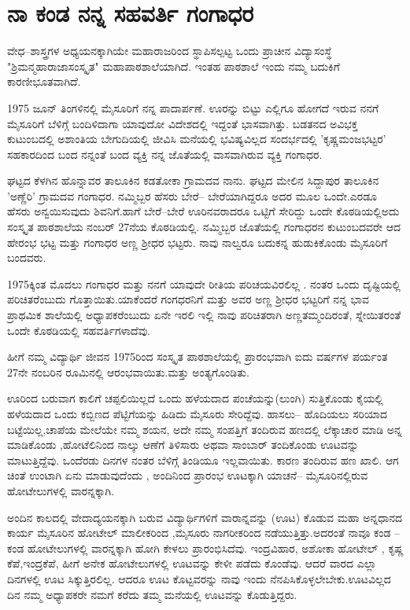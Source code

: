 \chapter{ನಾ ಕಂಡ ನನ್ನ ಸಹವರ್ತಿ ಗಂಗಾಧರ}

\begin{center}
\addrule
\end{center}

ವೇಧ–ಶಾಸ್ತ್ರಗಳ ಅಧ್ಯಯನಕ್ಕಾಗಿಯೇ ಮಹಾರಾಜರಿಂದ ಸ್ಥಾಪಿಸಲ್ಪಟ್ಟ ಒಂದು ಪ್ರಾಚೀನ ವಿದ್ಯಾಸಂಸ್ಥೆ   "ಶ್ರಿಮನ್ಮಹಾರಾಜಾಸಂಸ್ಕೃತ" ಮಹಾಪಾಠಶಾಲೆಯಾಗಿದೆ.  ಇಂತಹ ಪಾಠಶಾಲೆ ಇಂದು ನಮ್ಮ ಬದುಕಿಗೆ ಕಾರಣೀಭೂತವಾಗಿದೆ. 

1975 ಜೂನ್ ತಿಂಗಳಿನಲ್ಲಿ ಮೈಸೂರಿಗೆ ನನ್ನ ಪಾದಾರ್ಪಣೆ. ಊರನ್ನು ಬಿಟ್ಟು ಎಲ್ಲಿಗೂ ಹೋಗದೆ ಇರುವ ನನಗೆ ಮೈಸೂರಿಗೆ ಬೆಳಿಗ್ಗೆ ಬಂದಿಳಿದಾಗಾ ಯಾವುದೋ ವಿದೇಶದಲ್ಲಿ ಇದ್ದಂತೆ ಭಾಸವಾಗಿತ್ತು. ಬಡತನದ ಅವಿಭಕ್ತ ಕುಟುಂಬದಲ್ಲಿ  ಅಶಾಂತಿಯ ಬೇಗುದಿಯಲ್ಲಿ ಜೀವಿಸಿ ಮನೆಯಲ್ಲಿ ಭವಿಷ್ಯವಿಲ್ಲದ ಸಂದರ್ಭದಲ್ಲಿ 'ಕೃಷ್ಣಮಂಜಭಟ್ಟರ' ಸಹಕಾರದಿಂದ ಬಂದ ನನ್ನಂತೆ  ಬಂದ ವ್ಯಕ್ತಿ ನನ್ನ ಜೊತೆಯಲ್ಲಿ ವಾಸವಾಗಿರುವ ವ್ಯಕ್ತಿ ಗಂಗಾಧರ.

ಘಟ್ಟದ ಕೆಳಗಿನ ಹೊನ್ನಾವರ ತಾಲೂಕಿನ ಕಡತೋಕಾ ಗ್ರಾಮದವ ನಾನು. ಘಟ್ಟದ ಮೇಲಿನ ಸಿದ್ದಾಪುರ ತಾಲೂಕಿನ 'ಅಣ್ಣೆರಿ' ಗ್ರಾಮದವ ಗಂಗಾಧರ. ನಮ್ಮಿಬ್ಬರ ಹೆಸರು ಬೇರೆ– ಬೇರೆಯಾಗಿದ್ದರೂ ಅದರ ಮೂಲ ಒಂದೇ.ಎರಡೂ ಹೆಸರು   ಅನ್ವಯಿಸುವುದು ಶಿವನಿಗೆ.ಹಾಗೆ ಬೇರೆ–ಬೇರೆ  ಊರಿನವರಾದರೂ ಒಟ್ಟಿಗೆ ಸೇರಿದ್ದು ಒಂದೇ ಕೊಠಡಿಯಲ್ಲಿಅದು ಸಂಸ್ಕೃತ ಪಾಠಶಾಲೆಯ  ನಂಬರ್ 27ನೆಯ ಕೊಠಡಿಯಲ್ಲಿ. ನಮ್ಮಿಬ್ಬರ ಜೊತೆಯಲ್ಲಿ ಗಂಗಾಧರನ ಕುಟುಂಬದವರೇ ಆದ ಹೇರಂಭ ಭಟ್ಟ ಮತ್ತು ಗಂಗಾಧರ ಅಣ್ಣ ಶ್ರೀಧರ ಭಟ್ಟರು. ನಾವು ನಾಲ್ವರೂ ಬದುಕನ್ನ ಹುಡುಕಿಕೊಂಡು ಮೈಸೂರಿಗೆ ಬಂದವರು. 

1975ಕ್ಕಿಂತ  ಮೊದಲು ಗಂಗಾಧರ ಮತ್ತು ನನಗೆ ಯಾವುದೇ ರೀತಿಯ ಪರಿಚಯವಿರಲಿಲ್ಲ . ನಂತರ ಒಂದು ದೃಷ್ಟಿಯಲ್ಲಿ ಪರಿಚಿತರೆಂಬುದು ಗೊತ್ತಾಯಿತು.ಯಾಕೆಂದರೆ  ಗಂಗಧರನಿಗೆ ಮತ್ತು ಅವರ ಅಣ್ಣ ಶ್ರೀಧರ ಭಟ್ಟರಿಗೆ  ನನ್ನ ಭಾವ ಪ್ರಾಥಮಿಕ ಶಾಲೆಯಲ್ಲಿ ಅಧ್ಯಾಪಕರೆಂಬುದು  ಏನೇ ಇರಲಿ ಇಲ್ಲಿ ನಾವು ಪರಿಚಿತರಾಗಿ ಅಣ್ಣತಮ್ಮಂದಿರಂತೆ, ಸ್ನೇಯಿತರಂತೆ ಒಂದೇ ಕೊಠಡಿಯಲ್ಲಿ ಸಹವರ್ತಿಗಳಾದೆವು. 

ಹೀಗೆ ನಮ್ಮ ವಿದ್ಯಾರ್ಥಿ ಜೀವನ 1975ರಿಂದ ಸಂಸ್ಕೃತ ಪಾಠಶಾಲೆಯಲ್ಲಿ ಪ್ರಾರಂಭವಾಗಿ ಐದು ವರ್ಷಗಳ ಪರ್ಯಂತ 27ನೇ ನಂಬರಿನ ರೂಮಿನಲ್ಲಿ ಆರಂಭವಾಯಿತು.ಮತ್ತು ಅಂತ್ಯಗೊಂಡಿತು. 

ಊರಿಂದ ಬರುವಾಗ ಕಾಲಿಗೆ ಚಪ್ಪಲಿಯಿಲ್ಲದೆ ಒಂದು ಹಳೆಯದಾದ ಪಂಚೆಯನ್ನು(ಲುಂಗಿ) ಸುತ್ತಿಕೊಂಡು ಕೈಯಲ್ಲಿ ಹಳೆಯದಾದ ಒಂದು ಕಬ್ಬಿಣದ ಪೆಟ್ಟಿಗೆಯನ್ನು ಹಿಡಿದು ಮೈಸೂರು ಸೇರಿದ್ದೆವು. ಹಾಸಲು– ಹೊದಿಯಲು ಸರಿಯಾದ ಬಟ್ಟೆಯಿಲ್ಲ,ಚಾಪೆಯ ಮೇಲೆಯೇ ನಮ್ಮ ಶಯನ, ಅದೇ ನಮ್ಮ ಸಂಪತ್ತಿಗೆ ತಂದಿರುವ ಹಣದಲ್ಲಿ ಲೆಕ್ಕಾಚಾರ ಮಾಡಿ ಅನ್ನ ಮಾಡಿಕೊಂಡು ,ಹೋಟೆಲಿನಿಂದ ನಾಲ್ಕು ಆಣೆಗೆ ತಿಳಿಸಾರು  ಅಥವಾ ಸಾಂಬಾರ್ ತಂದಿಕೊಂಡು ಊಟವನ್ನು ಮಾಟುತ್ತಿದ್ದೆವು. ಒಂದೆರಡು ದಿನಗಳ ನಂತರ ಬೆಳಿಗ್ಗೆ ತಿಂಡಿಯೂ ಇಲ್ಲವಾಯಿತು. ಕಾರಣ ತಂದಿರುವ ಹಣ ಖಾಲಿ. ಆಗ ಚಿಂತೆ ಉಂಟಾಗಿ ಏನು ಮಾಡುವುದೆಂದು , ಅಂದಿನಿಂದ ಪ್ರಾರಂಭ ಊಟಕ್ಕಾಗಿ ಯಾಚನೆ– ಮೈಸೂರಿನಲ್ಲಿರುವ ಹೋಟೇಲುಗಳಲ್ಲಿ ವಾರನ್ನಕ್ಕಾಗಿ.

ಅಂದಿನ ಕಾಲದಲ್ಲಿ ವೇದಾದ್ಯಯನಕ್ಕಾಗಿ ಬರುವ ವಿದ್ಯಾರ್ಥಿಗಳಿಗೆ ವಾರಾನ್ನವನ್ನು (ಊಟ) ಕೊಡುವ ಮಹಾ ಅನ್ನಧಾನದ ಕಾರ್ಯ ಮೈಸೂರಿನ ಹೋಟೇಲ್ ಮಾಲೀಕರಿಂದ ,ಮೈಸೂರು ನಾಗರೀಕರಿಂದ ನಡೆಯುತ್ತಿತ್ತು.ಅದರಂತೆ ನಾವೂ ಕಂಡ –ಕಂಡ  ಹೋಟೇಲುಗಳಲ್ಲಿ ವಾರನ್ನಕ್ಕಾಗಿ ಹೋಗಿ ಕೇಳಲು ಪ್ರಾರಂಭಿಸಿದೆವು. ಇಂದ್ರವಿಹಾರ, ಅಶೋಕಾ ಹೋಟೇಲ್ , ಕೃಷ್ಣ ಕೆಪೆ,ಇಂದ್ರಕೆಪೆ, ಹೀಗೆ ಅನೇಕ ಹೋಟೇಲುಗಳಲ್ಲಿ ಊಟವನ್ನು ಕೇಳೀ ಪಡೆದು ಕೊಂಡೆವು. ಆದರೆ ವಾರದ ಎಲ್ಲಾ ದಿನಗಳಲ್ಲಿ ಊಟ ಸಿಕ್ಕುತ್ತಿರಲಿಲ್ಲ. ಆದರೂ ಊಟ ಕೊಟ್ಟವರನ್ನು ನಾವು ಇಂದು ನೆನಪಿಸಿಕೊಳ್ಳಲೇಬೇಕು.ಊಟವಿಲ್ಲದ ದಿನ ನಮ್ಮ ಅಧ್ಯಾಪಕರೇ ನಮಗೆ ಕರೆದು ತಮ್ಮ ಮನೆಯಲ್ಲಿ ಊಟವನ್ನು ಕೊಡುತ್ತಿದ್ದರು. 

